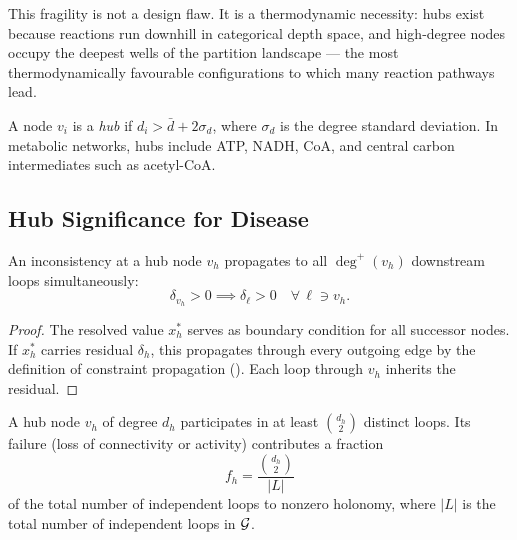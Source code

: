 This fragility is not a design flaw.  It is a thermodynamic necessity:
hubs exist because reactions run downhill in categorical depth space, and
high-degree nodes occupy the deepest wells of the partition landscape ---
the most thermodynamically favourable configurations to which many
reaction pathways lead.

\begin{definition}
\label{def:hub}
A node $v_i$ is a \emph{hub} if $d_i > \bar{d} + 2\sigma_d$, where
$\sigma_d$ is the degree standard deviation.  In metabolic networks, hubs
include ATP, NADH, CoA, and central carbon intermediates such as
acetyl-CoA.
\end{definition}

\subsection{Hub Significance for Disease}

\begin{theorem}
\label{thm:hub-vulnerability}
An inconsistency at a hub node $v_h$ propagates to all $\deg^{+}(v_h)$
downstream loops simultaneously:
\begin{equation}
  \delta_{v_h} > 0
  \implies
  \delta_\ell > 0 \quad \forall\, \ell \ni v_h.
\end{equation}
\end{theorem}

\begin{proof}
The resolved value $x_h^{*}$ serves as boundary condition for all
successor nodes.  If $x_h^{*}$ carries residual $\delta_h$, this
propagates through every outgoing edge by the definition of constraint
propagation ().  Each loop through $v_h$
inherits the residual.
\end{proof}

\begin{proposition}
\label{prop:hub-holonomy}
A hub node $v_h$ of degree $d_h$ participates in at least
$\binom{d_h}{2}$ distinct loops.  Its failure (loss of connectivity or
activity) contributes a fraction
\begin{equation}
  f_h = \frac{\binom{d_h}{2}}{|L|}
  \label{eq:hub-fraction}
\end{equation}
of the total number of independent loops to nonzero holonomy, where $|L|$
is the total number of independent loops in $\mathcal{G}$.
\end{proposition}

